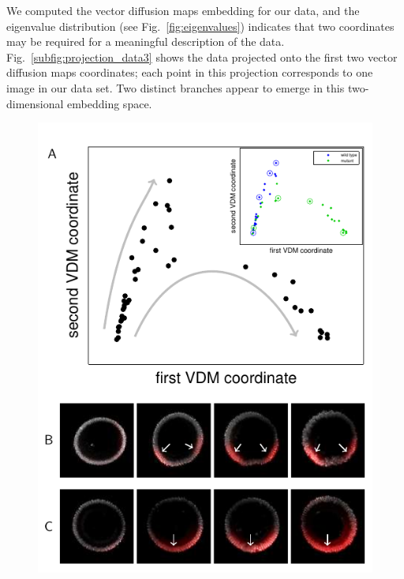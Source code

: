 \documentclass{pnastwo}
\newcommand{\fig}[0]{Fig.}
\begin{document}
\begin{article}
We computed the vector diffusion maps embedding for our data, and the eigenvalue distribution (see \fig~\ref{fig:eigenvalues}) indicates that two coordinates may be required for a meaningful description of the data. 
%
\fig~\ref{subfig:projection_data3} shows the data projected onto the first two vector diffusion maps coordinates; each point in this projection corresponds to one image in our data set.
%
Two distinct branches appear to emerge in this two-dimensional embedding space.

\begin{figure}[h]
\includegraphics{fig5_2}

\end{figure}
\end{article}
\end{document}
